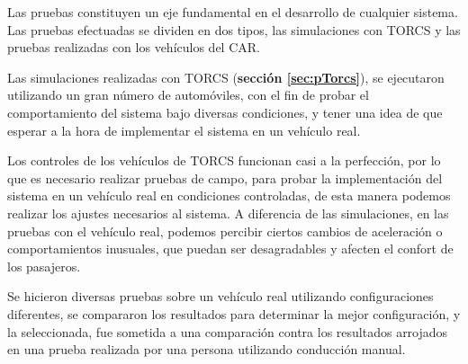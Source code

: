 Las pruebas constituyen un eje fundamental en el desarrollo de cualquier sistema. Las pruebas efectuadas se dividen en dos tipos, las simulaciones con \gls{TORCS} y las pruebas realizadas con los vehículos del CAR.

Las simulaciones realizadas con \gls{TORCS} (\textbf{sección \ref{sec:pTorcs}}), se ejecutaron utilizando un gran número de automóviles, con el fin de probar el comportamiento del sistema bajo diversas condiciones, y tener una idea de que esperar a la hora de implementar el sistema en un vehículo real.

Los controles de los vehículos de \gls{TORCS} funcionan casi a la perfección, por lo que es necesario realizar pruebas de campo, para probar la implementación del sistema en un vehículo real en condiciones controladas, de esta manera podemos realizar los ajustes necesarios al sistema. A diferencia de las simulaciones, en las pruebas con el vehículo real, podemos percibir ciertos cambios de aceleración o comportamientos inusuales, que puedan ser desagradables y afecten el confort de los pasajeros. 

Se hicieron diversas pruebas sobre un vehículo real utilizando configuraciones diferentes, se compararon los resultados para determinar la mejor configuración, y la seleccionada, fue sometida a una comparación contra los resultados arrojados en una prueba realizada por una persona utilizando conducción manual.      

